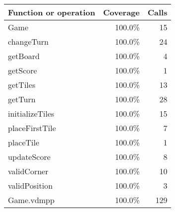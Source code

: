 \bigskip
\begin{longtable}{|l|r|r|}
\hline
Function or operation & Coverage & Calls \\
\hline
\hline
Game & 100.0\% & 15 \\
\hline
changeTurn & 100.0\% & 24 \\
\hline
getBoard & 100.0\% & 4 \\
\hline
getScore & 100.0\% & 1 \\
\hline
getTiles & 100.0\% & 13 \\
\hline
getTurn & 100.0\% & 28 \\
\hline
initializeTiles & 100.0\% & 15 \\
\hline
placeFirstTile & 100.0\% & 7 \\
\hline
placeTile & 100.0\% & 1 \\
\hline
updateScore & 100.0\% & 8 \\
\hline
validCorner & 100.0\% & 10 \\
\hline
validPosition & 100.0\% & 3 \\
\hline
\hline
Game.vdmpp & 100.0\% & 129 \\
\hline
\end{longtable}

